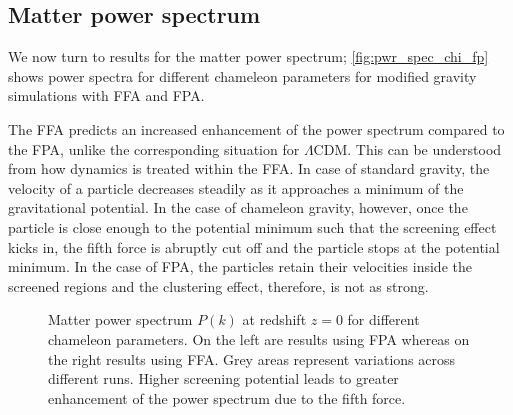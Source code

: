 \subsection{Matter power spectrum}
We now turn to results for the matter power spectrum; \autoref{fig:pwr_spec_chi_fp} shows power spectra for different chameleon parameters for modified gravity simulations with FFA and FPA.

The FFA predicts an increased enhancement of the power spectrum compared to the FPA, unlike the corresponding situation for $\Lambda$CDM. This can be understood from how dynamics is treated within the FFA. In case of standard gravity, the velocity of a particle decreases steadily as it approaches a minimum of the gravitational potential. In the case of chameleon gravity, however, once the particle is close enough to the potential minimum such that the screening effect kicks in, the fifth force is abruptly cut off and the particle stops at the potential minimum. In the case of FPA, the particles retain their velocities inside the screened regions and the clustering effect, therefore, is not as strong.

\begin{figure*}
\centering
	\begin{subfigure}{1.0\textwidth}
	\end{subfigure}
	\begin{subfigure}{0.5\textwidth}
	\end{subfigure}%
	\begin{subfigure}{0.5\textwidth}
	\end{subfigure}
	\begin{subfigure}{0.5\textwidth}
	\end{subfigure}%
	\begin{subfigure}{0.5\textwidth}
	\end{subfigure}
    \caption{Matter power spectrum $P(k)$ at redshift $z=0$ for different chameleon parameters. On the left are results using FPA whereas on the right results using FFA. Grey areas represent variations across different runs. Higher screening potential leads to greater enhancement of the power spectrum due to the fifth force.}
    \label{fig:pwr_spec_chi_fp}
\end{figure*}

